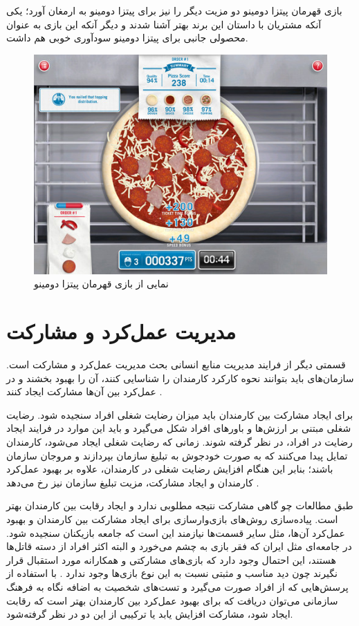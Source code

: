 بازی قهرمان پیتزا دومینو دو مزیت دیگر را نیز برای پیتزا دومینو به ارمغان آورد‌؛ یکی آنکه مشتریان با داستان این برند بهتر آشنا شدند و دیگر آنکه این بازی به عنوان محصولی جانبی برای پیتزا دومینو سودآوری خوبی هم داشت.
\begin{figure}[!htb]
	\centering
	\includegraphics[width=\textwidth]{Figures/domino.png}
	\caption{نمایی از بازی قهرمان پیتزا دومینو}
\end{figure}

\section{مدیریت عمل‌کرد و مشارکت}
قسمتی دیگر از فرایند مدیریت منابع انسانی بحث مدیریت عمل‌کرد و مشارکت است. سازمان‌های باید بتوانند نحوه کارکرد کارمندان را شناسایی کنند، آن را بهبود بخشند و در عمل‌کرد بین آن‌ها مشارکت ایجاد کنند \cite{review}.

برای ایجاد مشارکت بین کارمندان باید میزان رضایت شغلی افراد سنجیده شود. رضایت شغلی مبتنی بر ارزش‌ها و باورهای افراد شکل می‌گیرد و باید این موارد در فرایند ایجاد رضایت در افراد، در نظر گرفته شوند. زمانی که رضایت شغلی ایجاد می‌شود، کارمندان تمایل پیدا می‌کنند که به صورت خودجوش به تبلیغ سازمان بپردازند و مروجان سازمان باشند؛ بنابر این هنگام افزایش رضایت شغلی در کارمندان، علاوه بر بهبود عمل‌کرد کارمندان و ایجاد مشارکت، مزیت تبلیغ سازمان نیز رخ می‌دهد \cite{mrg}.

طبق مطالعات چو \cite{actionable} گاهی مشارکت نتیجه مطلوبی ندارد و ایجاد رقابت بین کارمندان بهتر است. پیاده‌سازی روش‌های بازی‌وارسازی برای ایجاد مشارکت بین کارمندان و بهبود عمل‌کرد آن‌ها، مثل سایر قسمت‌ها نیازمند این است که جامعه بازیکنان سنجیده شود. در جامعه‌ای مثل ایران که فقر بازی به چشم می‌خورد و البته اکثر افراد از دسته قاتل‌ها هستند، این احتمال وجود دارد که بازی‌های مشارکتی و همکارانه مورد استقبال قرار نگیرند چون دید مناسب و مثبتی نسبت به این نوع بازی‌ها وجود ندارد \cite{atoz}. با استفاده از پرسش‌هایی که از افراد صورت می‌گیرد و تست‌های شخصیت به اضافه نگاه به فرهنگ سازمانی می‌توان دریافت که برای بهبود عمل‌کرد بین کارمندان بهتر است که رقابت ایجاد شود، مشارکت افزایش یابد یا ترکیبی از این دو در نظر گرفته‌شود.
